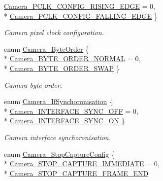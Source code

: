 \begin{DoxyCompactItemize}
\hyperlink{_camera_8h_a081a0e4af0b04d76a5476d22e6cf8657ade970e1c835dea0c6d00f94fcf2abdca}{Camera\+\_\+\+P\+C\+L\+K\+\_\+\+C\+O\+N\+F\+I\+G\+\_\+\+R\+I\+S\+I\+N\+G\+\_\+\+E\+D\+G\+E} = 0, 
\\*
\hyperlink{_camera_8h_a081a0e4af0b04d76a5476d22e6cf8657a2cab0af65ebc5fd82af8bd118d20a6da}{Camera\+\_\+\+P\+C\+L\+K\+\_\+\+C\+O\+N\+F\+I\+G\+\_\+\+F\+A\+L\+L\+I\+N\+G\+\_\+\+E\+D\+G\+E}
 \}
\begin{DoxyCompactList}\small\item\em Camera pixel clock configuration. \end{DoxyCompactList}\item 
enum \hyperlink{_camera_8h_ae5c1282ca99dd27ba0faf0f16f6e9904}{Camera\+\_\+\+Byte\+Order} \{ \\*
\hyperlink{_camera_8h_ae5c1282ca99dd27ba0faf0f16f6e9904a819196064eea1c6f65a0aeaee5f99acb}{Camera\+\_\+\+B\+Y\+T\+E\+\_\+\+O\+R\+D\+E\+R\+\_\+\+N\+O\+R\+M\+A\+L} = 0, 
\\*
\hyperlink{_camera_8h_ae5c1282ca99dd27ba0faf0f16f6e9904a90cfebe886cda289023a577c9b2cc831}{Camera\+\_\+\+B\+Y\+T\+E\+\_\+\+O\+R\+D\+E\+R\+\_\+\+S\+W\+A\+P}
 \}
\begin{DoxyCompactList}\small\item\em Camera byte order. \end{DoxyCompactList}\item 
enum \hyperlink{_camera_8h_a741d469cc903899255a1d3e76fdce47b}{Camera\+\_\+\+If\+Synchoronisation} \{ \\*
\hyperlink{_camera_8h_a741d469cc903899255a1d3e76fdce47baebefaa79a8ad8c68d84f3e0839dd7ef8}{Camera\+\_\+\+I\+N\+T\+E\+R\+F\+A\+C\+E\+\_\+\+S\+Y\+N\+C\+\_\+\+O\+F\+F} = 0, 
\\*
\hyperlink{_camera_8h_a741d469cc903899255a1d3e76fdce47bab3f554e1d669f4d87917f3f43a45727b}{Camera\+\_\+\+I\+N\+T\+E\+R\+F\+A\+C\+E\+\_\+\+S\+Y\+N\+C\+\_\+\+O\+N}
 \}
\begin{DoxyCompactList}\small\item\em Camera interface synchoronisation. \end{DoxyCompactList}\item 
enum \hyperlink{_camera_8h_a783564f838bc718a5b56f114027f5185}{Camera\+\_\+\+Stop\+Capture\+Config} \{ \\*
\hyperlink{_camera_8h_a783564f838bc718a5b56f114027f5185a95410e8c6eb0a0ae4488f722931d4150}{Camera\+\_\+\+S\+T\+O\+P\+\_\+\+C\+A\+P\+T\+U\+R\+E\+\_\+\+I\+M\+M\+E\+D\+I\+A\+T\+E} = 0, 
\\*
\hyperlink{_camera_8h_a783564f838bc718a5b56f114027f5185a949d55caf973f4e50fbf1fa3e4246718}{Camera\+\_\+\+S\+T\+O\+P\+\_\+\+C\+A\+P\+T\+U\+R\+E\+\_\+\+F\+R\+A\+M\+E\+\_\+\+E\+N\+D}

\end{DoxyCompactItemize}
